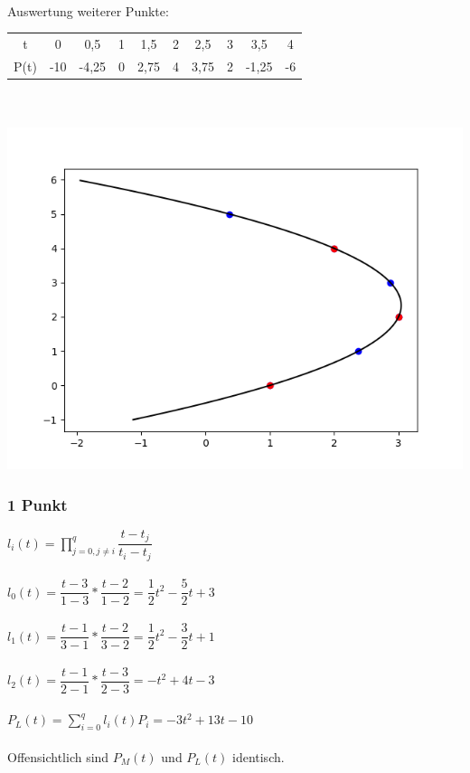 \\
Auswertung weiterer Punkte:
\begin{tabular}[optional Position]{c c c c c c c c c c}
	t & 0 & 0,5 & 1 & 1,5 & 2 & 2,5 & 3 & 3,5 & 4 \\
	P(t) & -10 & -4,25 & 0 & 2,75 & 4 & 3,75 & 2 & -1,25 & -6
\end{tabular}\\
\\
\includegraphics{1a}
\subsubsection{1 Punkt}
$l_{i}(t) = {\displaystyle \prod_{j=0,j \neq i}^{q}} \dfrac{t - t_{j}}{t_{i} - t_{j}}$ \\
\\
$l_{0}(t) = \dfrac{t - 3}{1 - 3} * \dfrac{t - 2}{1 - 2} = \dfrac{1}{2}t^{2} - \dfrac{5}{2}t + 3$ \\
\\
$l_{1}(t) = \dfrac{t - 1}{3 - 1} * \dfrac{t - 2}{3 - 2} = \dfrac{1}{2}t^{2} - \dfrac{3}{2}t + 1$ \\
\\
$l_{2}(t) = \dfrac{t - 1}{2 - 1} * \dfrac{t - 3}{2 - 3} = -t^{2} + 4t - 3$ \\
\\
$P_{L}(t) = {\displaystyle \sum_{i=0}^{q}} l_{i}(t)P_{i} = -3t^{2} + 13t - 10$\\
\\
Offensichtlich sind $P_{M}(t)$ und $P_{L}(t)$ identisch.
